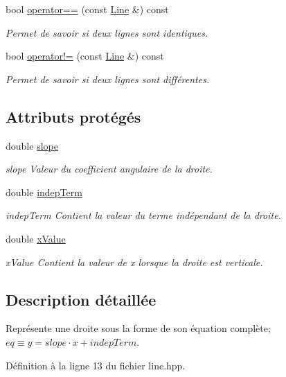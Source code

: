 \begin{DoxyCompactItemize}
bool \hyperlink{classLine_a5f1b6226cd499d6d209cda4b8517c9b7}{operator==} (const \hyperlink{classLine}{Line} \&) const 
\begin{DoxyCompactList}\small\item\em Permet de savoir si deux lignes sont identiques. \end{DoxyCompactList}\item 
bool \hyperlink{classLine_ae2cb0479252a7f5a2c163d1197fc990f}{operator!=} (const \hyperlink{classLine}{Line} \&) const 
\begin{DoxyCompactList}\small\item\em Permet de savoir si deux lignes sont différentes. \end{DoxyCompactList}\end{DoxyCompactItemize}
\subsection*{Attributs protégés}
\begin{DoxyCompactItemize}
\item 
double \hyperlink{classLine_a0aa35363f8285600b12ce54258338b8c}{slope}
\begin{DoxyCompactList}\small\item\em slope Valeur du coefficient angulaire de la droite. \end{DoxyCompactList}\item 
double \hyperlink{classLine_a6ea839b47ccf670770ebc7dff9f0dbba}{indep\+Term}
\begin{DoxyCompactList}\small\item\em indep\+Term Contient la valeur du terme indépendant de la droite. \end{DoxyCompactList}\item 
double \hyperlink{classLine_af8b70928b9624988c1c42f33af93391a}{x\+Value}
\begin{DoxyCompactList}\small\item\em x\+Value Contient la valeur de x lorsque la droite est verticale. \end{DoxyCompactList}\end{DoxyCompactItemize}


\subsection{Description détaillée}
Représente une droite sous la forme de son équation complète; $ eq \equiv y = slope \cdot x + indepTerm $. 

Définition à la ligne 13 du fichier line.\+hpp.



